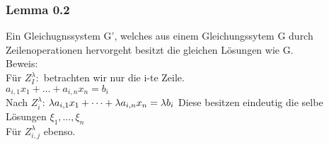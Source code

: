 \documentclass{scrartcl}
\newcommand{\lb}{\lambda}
\begin{document}
\subsubsection{Lemma 0.2}
Ein Gleichugnssystem G', welches aus einem Gleichungssytem G durch Zeilenoperationen hervorgeht besitzt die gleichen L\"osungen wie G.\\
Beweis:\\
F\"ur \(Z_I^\lb: \) betrachten wir nur die i-te Zeile.\\
\(a_{i,1}x_1 + \dots + a_{i,n}x_n = b_i\)\\
Nach \(Z_i^\lb\):
\(\lb a_{i,1}x_1 + \dots + \lb a_{i,n}x_n = \lb b_i\\\)
Diese besitzen eindeutig die selbe L\"osungen \(\xi_1, \dots, \xi_n\)\\
F\"ur \(Z_{i,j}^\lb\) ebenso.
\end{document}

